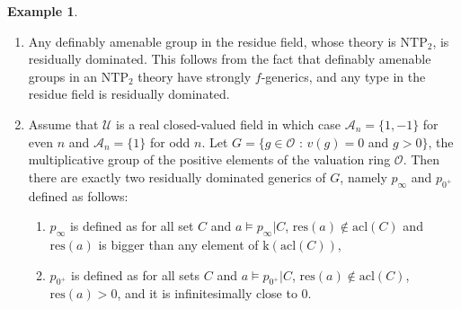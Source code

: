 \documentclass[12pt]{article}
\newcommand{\NTP}{\mathrm{NTP_2}}
\newcommand{\res}{\mathrm{res}}
\newcommand{\acl}{\mathrm{acl}}
\newcommand{\val}{\textit{v}}
\newcommand{\0}{\emptyset}
\newcommand{\rf}{\mathrm{k}}
\newcommand{\A}{\mathcal{A}}
\newcommand{\U}{\mathcal{U}}
\theoremstyle{plain}%
\theoremstyle{definition}
\newtheorem{exmp}[thm]{Example}
\theoremstyle{remark}
\begin{document}
\begin{exmp}\begin{enumerate}
\item Any definably amenable group in the residue field, whose theory is $\NTP$, is residually dominated. This follows from the fact that definably amenable groups in an $\NTP$ theory have strongly $f$-generics, and any type in the residue field is residually dominated. 
\item Assume that $\U$ is a real closed-valued field in which case $\A_n=\{1,-1\}$ for even $n$ and $\A_n=\{1\}$ for odd $n$. Let $G = \{ g\in \mathcal{O} $ :  $ \val(g)=0$ and $g>0\}$, the multiplicative group of the positive elements of the valuation ring $\mathcal{O}$. Then there are exactly two residually dominated generics of $G$, namely $p_{\infty}$ and $p_{0^+}$ defined as follows:
    \begin{enumerate}
        \item $p_{\infty}$ is defined as for all set $C$ and $a\models p_{\infty}|C$, $\res(a)\not\in \acl(C)$ and $\res(a)$ is bigger than any element of $\rf(\acl(C))$,
        \item $p_{0^{+}}$ is defined as for all sets $C$ and $a\models p_{0^{+}}|C$, $\res(a)\not\in \acl(C)$, $\res(a)>0$, and it is infinitesimally close to $0$.
        
    \end{enumerate}
    \end{enumerate}
\end{exmp}

\end{document}
